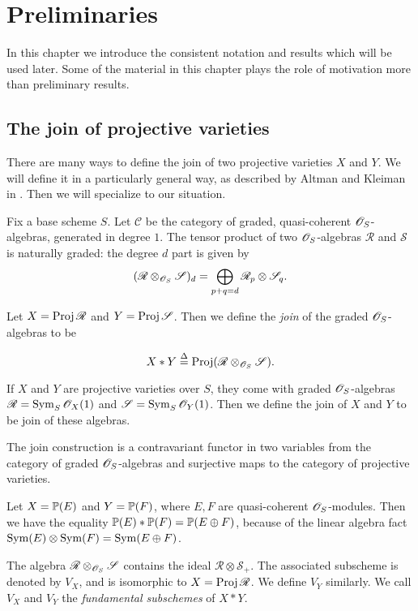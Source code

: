 \chapter{Preliminaries}
\label{sec:prelims}

In this chapter we introduce the consistent notation and results which will be used later. Some of the material in this chapter plays the role of motivation more than preliminary results.

\section{The join of projective varieties}

There are many ways to define the join of two projective varieties $X$ and $Y$. We will define it in a particularly general way, as described by Altman and Kleiman in \cite{altman_joins}. Then we will specialize to our situation.

Fix a base scheme $S$. Let $\mathscr C$ be the category of graded, quasi-coherent $\OO_S$-algebras, generated in degree $1$. The tensor product of two $\OO_S$-algebras $\mathscr R$ and $\mathscr S$  is naturally graded: the degree $d$ part is given by
\[
(\mathscr R \otimes_{\OO_S} \mathscr S)_d = \bigoplus_{p+q=d} \mathscr R_p \otimes \mathscr S_q.
\]

Let $X=\Proj \mathscr R$ and $Y = \Proj \mathscr S$. Then we define the \emph{join} of the graded $\OO_S$-algebras to be

\[
X \ast Y \stackrel \Delta =  \Proj (\mathscr R \otimes_{\OO_S} \mathscr S).
\]

If $X$ and $Y$ are projective varieties over $S$, they come with graded $\OO_S$-algebras $\mathscr R = \Sym_S \OO_X(1)$ and $\mathscr S = \Sym_S \OO_Y(1)$. Then we define the join of $X$ and $Y$ to be join of these algebras.

The join construction is a contravariant functor in two variables from the category of graded $\OO_S$-algebras and surjective maps to the category of projective varieties.

\begin{example}
Let $X=\P(E)$ and $Y=\P(F)$, where $E,F$ are quasi-coherent $\OO_S$-modules. Then we have the equality $\P(E) \ast \P(F) = \P(E \oplus F)$, because of the linear algebra fact $\Sym(E) \otimes \Sym(F) = \Sym(E \oplus F)$.
\end{example}

The algebra $\mathscr R \otimes_{\OO_S} \mathscr S$ contains the ideal $\mathscr R \otimes \mathscr S_+$. The associated subscheme is denoted by $V_X$, and is isomorphic to $X = \Proj \mathscr R$. We define $V_Y$ similarly. We call $V_X$ and $V_Y$ the \emph{fundamental subschemes} of $X \ast Y$.

